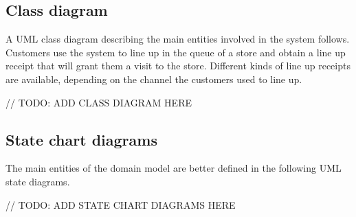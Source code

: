 \documentclass[../../main.tex]{subfiles}
\begin{document}
\subsection{Class diagram}

A UML class diagram describing the main entities involved in the system follows. Customers use the system to line up in the queue of a store and obtain a line up receipt that will grant them a visit to the store. Different kinds of line up receipts are available, depending on the channel the customers used to line up.

// TODO: ADD CLASS DIAGRAM HERE

\subsection{State chart diagrams}

The main entities of the domain model are better defined in the following UML state diagrams.

// TODO: ADD STATE CHART DIAGRAMS HERE
\end{document}
